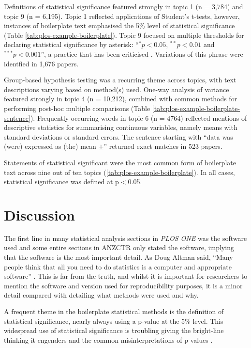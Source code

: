 \documentclass[12pt]{article}
\begin{document}
Definitions of statistical significance featured strongly in topic 1 (n
= 3,784) and topic 9 (n = 6,195). Topic 1 reflected applications of Student's t-tests, however,
instances of boilerplate text emphasised the 5\% level of statistical significance (Table \ref{tab:plos-example-boilerplate}). Topic 9
focused on multiple thresholds for declaring statistical significance by asterisk: ``\(^{*}p<0.05\), \(^{**}p<0.01\) and \(^{***}p<0.001\)'', a
practice that has been criticised \citep{Wasserstein2019}. Variations of this phrase were identfied in 1,676 papers.

Group-based hypothesis testing was a recurring theme across topics, with
text descriptions varying based on method(s) used. One-way analysis of
variance featured strongly in topic 4 (n = 10,212), combined
with common methods for performing post-hoc multiple comparisons (Table \ref{tab:plos-example-boilerplate-sentence}). 
Frequently occurring words in topic 6 (n = 4764) reflected
mentions of descriptive statistics for summarising continuous variables,
namely means with standard deviations or standard errors. The sentence starting with ``data was (were) expressed as (the) mean $\pm$'' returned exact matches in 523 papers.

Statements of statistical significant were the most common form of boilerplate text across nine out of ten topics (\ref{tab:plos-example-boilerplate}). In all cases, statistical significance was defined at p$<$0.05.

\hypertarget{discussion}{%
\section{Discussion}\label{discussion}}

The first line in many statistical analysis sections in \emph{PLOS ONE}
was the software used and some entire sections in ANZCTR only stated the
software, implying that the software is the most important detail. As
Doug Altman said, ``Many people think that all you need to do statistics
is a computer and appropriate software'' \citep{Altman1994}. This is far
from the truth, and whilst it is important for researchers to mention
the software and version used for reproducibility purposes, it is a
minor detail compared with detailing what methods were used and why.

A frequent theme in the boilerplate statistical methods is the
definition of statistical significance, nearly always using a p-value at
the 5\% level. This widespread use of statistical significance is
troubling giving the bright-line thinking it engenders
\citep{McShane2019} and the common misinterpretations of p-values
\citep{Goodman2008}.
\end{document}
